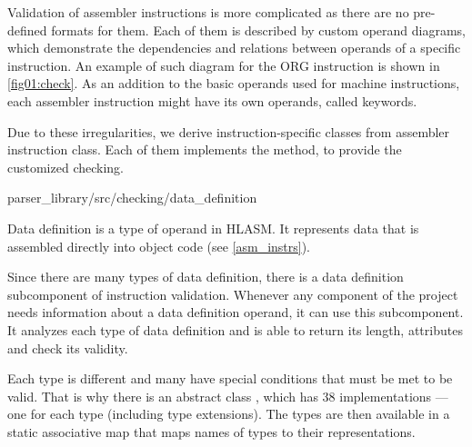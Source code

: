 Validation of assembler instructions is more complicated as there are no pre-defined formats for them. Each of them is described by custom operand diagrams, which demonstrate the dependencies and relations between operands of a specific instruction. An example of such diagram for the ORG instruction is shown in \cref{fig01:check}. As an addition to the basic operands used for machine instructions, each assembler instruction might have its own operands, called keywords.

Due to these irregularities, we derive instruction-specific classes from assembler instruction class. Each of them implements the  method, to provide the customized checking.

{parser\_library/src/checking/data\_definition}

Data definition is a type of operand in HLASM. It represents data that is assembled directly into object code (see \cref{asm_instrs}).

Since there are many types of data definition, there is a data definition subcomponent of instruction validation. Whenever any component of the project needs information about a data definition operand, it can use this subcomponent. It analyzes each type of data definition and is able to return its length, attributes and check its validity.

Each type is different and many have special conditions that must be met to be valid. That is why there is an abstract class , which has 38 implementations --- one for each type (including type extensions). The types are then available in a static associative map that maps names of types to their representations.

